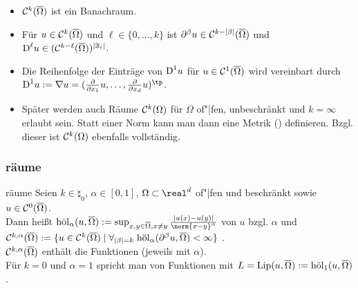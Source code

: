 \begin{Bem}
    \begin{itemize}
        \item
        $\C^k(\overline{\Omega})$ ist ein Banachraum.

        \item
        Für $u \in \C^k(\overline{\Omega})$ und $\ell \in \{0, \dotsc, k\}$ ist
        $\partial^\beta u \in \C^{k - |\beta|}(\overline{\Omega})$ und
        $\D^\ell u \in (\C^{k - \ell}(\overline{\Omega}))^{|\BB_\ell|}$.

        \item
        Die Reihenfolge der Einträge von $\D^1 u$ für $u \in \C^1(\overline{\Omega})$ wird
        vereinbart durch\\
        $\D^1 u := \nabla u =
        (\frac{\partial}{\partial x_1} u, \dotsc, \frac{\partial}{\partial x_d} u)^\tp$.

        \item
        Später werden auch Räume $\C^k(\Omega)$ für $\Omega$ of"|fen, unbeschränkt und
        $k = \infty$ erlaubt sein.
        Statt einer Norm kann man dann eine Metrik () definieren.
        Bzgl. dieser ist $\C^k(\Omega)$ ebenfalls vollständig.
    \end{itemize}
\end{Bem}

\subsubsection{%
    räume%
}

\begin{Def}{räume}
    Seien $k \in \natural_0$, $\alpha \in [0, 1]$, $\Omega \subset \real^d$ of"|fen
    und beschränkt sowie $u \in \C^0(\overline{\Omega})$.\\
    Dann heißt $\hol_\alpha(u, \overline{\Omega}) := \sup_{x, y \in \overline{\Omega}, x \not= y}
    \frac{|u(x) - u(y)|}{\norm{x - y}^\alpha}$  von $u$
    bzgl. $\alpha$ und\\
    $\C^{k,\alpha}(\overline{\Omega}) := \{u \in \C^k(\overline{\Omega}) \;|\;
    \forall_{|\beta| = k}\; \hol_\alpha(\partial^\beta u, \overline{\Omega}) < \infty\}$
    .\\
    $\C^{k,\alpha}(\overline{\Omega})$ enthält die  Funktionen
    (jeweils mit  $\alpha$).\\
    Für $k = 0$ und $\alpha = 1$ spricht man von  Funktionen
    mit 
    $L = \Lip(u, \overline{\Omega}) := \hol_1(u, \overline{\Omega})$.
\end{Def}

